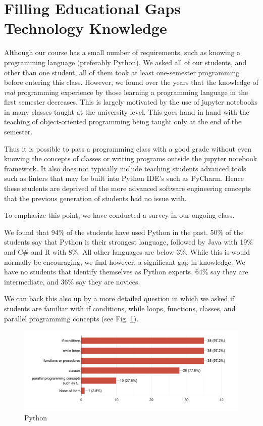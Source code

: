 \documentclass[conference]{IEEEtran}
\begin{document}
\section{Filling Educational Gaps Technology Knowledge}

Although our course has a small number of requirements, such as knowing a programming language (preferably Python). We asked all of our students, and other than one student, all of them took at least one-semester programming before entering this class. However, we found over the years that the knowledge of {\em real} programming experience by those learning a programming language in the first semester decreases. This is largely motivated by the use of jupyter notebooks in many classes taught at the university level. This goes hand in hand with the teaching of object-oriented programming being taught only at the end of the semester.

Thus it is possible to pass a programming class with a good grade without even knowing the concepts of classes or writing programs outside the jupyter notebook framework. It also does not typically include teaching students advanced tools such as linters that may be built into Python IDE's such as PyCharm. Hence these students are deprived of the more advanced software engineering concepts that the previous generation of students had no issue with.

To emphasize this point, we have conducted a survey in our ongoing class.

We found that 94\% of the students have used Python in the past.  50\% of the students say that Python is their strongest language, followed by Java with 19\% and C\# and R with 8\%. All other languages are below 3\%. While this is would normally be encouraging, we find however, a significant gap in knowledge. We have no students that identify themselves as Python experts, 64\% say they are intermediate, and 36\% say they are novices.

We can back this also up by a more detailed question in which we asked if students are familiar with if conditions, while loops, functions, classes, and parallel programming concepts (see Fig. \ref{fig:python}).

\begin{figure}[htb]
  \caption{Python}\label{fig:python}
  \centering
    \includegraphics[width=0.9\columnwidth]{images/python.png}

\end{figure}
\end{document}
